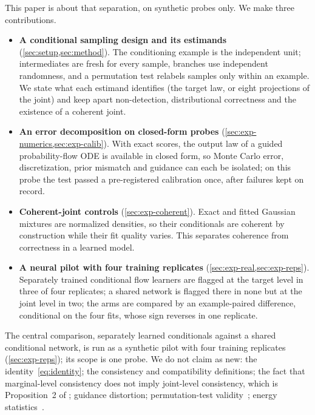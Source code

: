 \documentclass{article}
\theoremstyle{plain}
\theoremstyle{definition}
\theoremstyle{remark}
\begin{document}
This paper is about that separation, on synthetic probes only. We make three contributions.
\begin{itemize}
  \item \textbf{A conditional sampling design and its estimands} (\cref{sec:setup,sec:method}). The conditioning example is the independent unit; intermediates are fresh for every sample, branches use independent randomness, and a permutation test relabels samples only within an example. We state what each estimand identifies (the target law, or eight projections of the joint) and keep apart non-detection, distributional correctness and the existence of a coherent joint.
  \item \textbf{An error decomposition on closed-form probes} (\cref{sec:exp-numerics,sec:exp-calib}). With exact scores, the output law of a guided probability-flow ODE is available in closed form, so Monte Carlo error, discretization, prior mismatch and guidance can each be isolated; on this probe the test passed a pre-registered calibration once, after failures kept on record.
  \item \textbf{Coherent-joint controls} (\cref{sec:exp-coherent}). Exact and fitted Gaussian mixtures are normalized densities, so their conditionals are coherent by construction while their fit quality varies. This separates coherence from correctness in a learned model.
  \item \textbf{A neural pilot with four training replicates} (\cref{sec:exp-real,sec:exp-reps}). Separately trained conditional flow learners are flagged at the target level in three of four replicates; a shared network is flagged there in none but at the joint level in two; the arms are compared by an example-paired difference, conditional on the four fits, whose sign reverses in one replicate.
\end{itemize}
The central comparison, separately learned conditionals against a shared conditional network, is run as a synthetic pilot with four training replicates (\cref{sec:exp-reps}); its scope is one probe.
We do not claim as new: the identity~\eqref{eq:identity}; the consistency and compatibility definitions; the fact that marginal-level consistency does not imply joint-level consistency, which is Proposition~2 of \citet{klotergens2026tabular}; guidance distortion; permutation-test validity~\citep{ernst2004permutation,lehmann2005testing,phipson2010permutation}; energy statistics~\citep{szekely2013energy,baringhaus2004twosample}.

\end{document}
